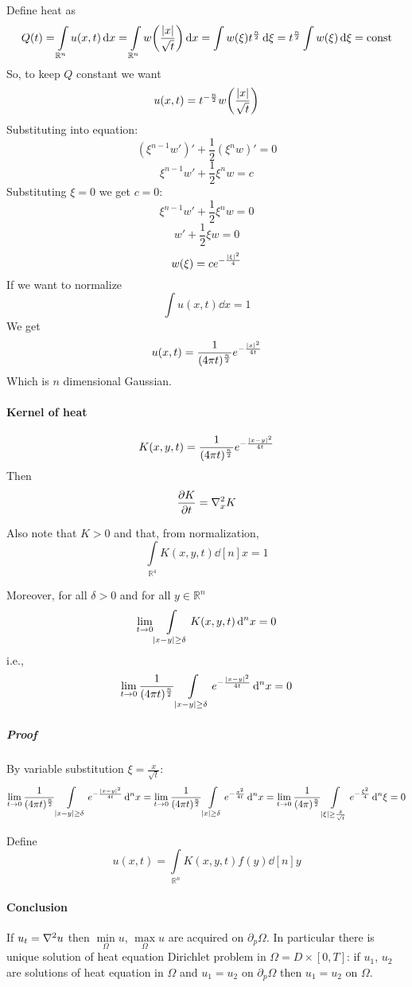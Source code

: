 Define heat as
$$Q(t) = \int\limits_{\mathbb{R}^n} u(x,t) \dd{x} = \int\limits_{\mathbb{R}^n} w\qty(\frac{\abs{x}}{\sqrt{t}}) \dd{x} = \int w(\xi) t^{\frac{n}{2}} \dd{\xi} = t^{\frac{n}{2}} \int w(\xi) \dd{\xi} = \text{const}$$
So, to keep $Q$ constant we want
$$u(x,t) = t^{-\frac{n}{2}} w\qty(\frac{\abs{x}}{\sqrt{t}}) $$
Substituting into equation:
$$(\xi^{n-1}w')' + \frac{1}{2} (\xi^n w)' = 0$$
$$\xi^{n-1}w' + \frac{1}{2} \xi^n w = c$$
Substituting $\xi=0$ we get $c=0$:
$$\xi^{n-1}w' + \frac{1}{2} \xi^n w = 0$$
$$w' + \frac{1}{2} \xi w = 0$$
$$w(\xi) = ce^{-\frac{\abs{\xi}^2}{4}}$$
If we want to normalize
$$\int u(x,t) \dd{x} = 1$$
We get
$$u(x,t) = \frac{1}{(4\pi t)^{\frac{n}{2}}} e^{-\frac{\abs{x}^2}{4t}}$$
Which is $n$ dimensional Gaussian.

\paragraph{Kernel of heat}
$$K(x,y,t) = \frac{1}{(4\pi t)^{\frac{n}{2}}} e^{-\frac{\abs{x-y}^2}{4t}}$$
Then
$$\pdv{K}{t} = \laplacian_x{K}$$

Also note that $K>0$ and that, from normalization,
$$\int\limits_{\mathbb{R}^4} K(x,y,t) \dd[n]{x} = 1$$

Moreover, for all $\delta>0$ and for all $y\in \mathbb{R}^n$ 
$$\lim_{t\to0} \int\limits_{\abs{x-y}\geq \delta} K(x,y,t) \dd[n]{x} = 0$$
i.e.,
$$\lim_{t\to0} \frac{1}{(4\pi t)^{\frac{n}{2}}}\int\limits_{\abs{x-y}\geq \delta} e^{-\frac{\abs{x-y}^2}{4t}} \dd[n]{x} = 0$$
\subparagraph{Proof}
By variable substitution $\xi = \frac{x}{\sqrt{t}}$:
$$\lim_{t\to0} \frac{1}{(4\pi t)^{\frac{n}{2}}}\int\limits_{\abs{x-y}\geq \delta} e^{-\frac{\abs{x-y}^2}{4t}} \dd[n]{x} =\lim_{t\to0} \frac{1}{(4\pi t)^{\frac{n}{2}}}\int\limits_{\abs{x}\geq \delta} e^{-\frac{x^2}{4t}} \dd[n]{x}  =\lim_{t\to0} \frac{1}{(4\pi)^{\frac{n}{2}}}\int\limits_{\abs{\xi}\geq \frac{\delta}{\sqrt{t}}} e^{-\frac{\xi^2}{4}} \dd[n]{\xi}= 0$$



Define
$$u(x,t) = \int\limits_{\mathbb{R}^n} K(x,y,t) f(y) \dd[n]{y}$$
\paragraph{Conclusion}
If $u_t=\laplacian{u}$
then $\min\limits_{ \Omega} u $, $\max\limits_{ \Omega} u $ are acquired on $\partial_p \Omega$. In particular there is unique solution of heat equation Dirichlet problem in $\Omega = D \times [0,T]$:
if $u_1$, $u_2$ are solutions of heat equation in $\Omega$ and $u_1=u_2$ on $\partial_p \Omega$ then $u_1=u_2$ on $\Omega$.
